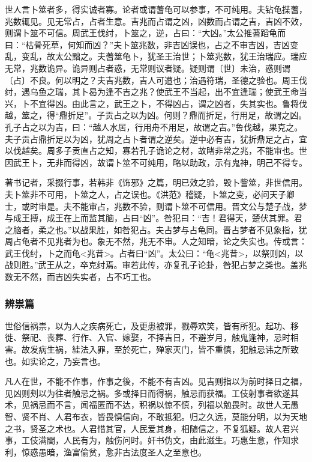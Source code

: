 \documentclass[]{article}
\begin{document}
世人言卜筮者多，得实诚者寡。论者或谓蓍龟可以参事，不可纯用。夫钻龟揲蓍，兆数辄见。见无常占，占者生意。吉兆而占谓之凶，凶数而占谓之吉，吉凶不效，则谓卜筮不可信。周武王伐纣，卜筮之，逆，占曰：``大凶。''太公推蓍蹈龟而曰：``枯骨死草，何知而凶？''夫卜筮兆数，非吉凶误也，占之不审吉凶，吉凶变乱，变乱，故太公黜之。夫蓍筮龟卜，犹圣王治世；卜筮兆数，犹王治瑞应。瑞应无常，兆数诡异。诡异则占者惑，无常则议者疑。疑则谓〔世〕未治，惑则谓〔占〕不良。何以明之？夫吉兆数，吉人可遭也；治遇符瑞，圣德之验也。周王伐纣，遇乌鱼之瑞，其卜曷为逢不吉之兆？使武王不当起，出不宜逢瑞；使武王命当兴，卜不宜得凶。由此言之，武王之卜，不得凶占，谓之凶者，失其实也。鲁将伐越，筮之，得``鼎折足''。子贡占之以为凶。何则？鼎而折足，行用足，故谓之凶。孔子占之以为吉，曰：``越人水居，行用舟不用足，故谓之吉。''鲁伐越，果克之。夫子贡占鼎折足以为凶，犹周之占卜者谓之逆矣。逆中必有吉，犹折鼎足之占，宜以伐越矣。周多子贡直占之知，寡若孔子诡论之材，故睹非常之兆，不能审也。世因武王卜，无非而得凶，故谓卜筮不可纯用，略以助政，示有鬼神，明己不得专。

著书记者，采掇行事，若韩非《饰邪》之篇，明已效之验，毁卜訾筮，非世信用。夫卜筮非不可用，卜筮之人，占之误也。《洪范》稽疑，卜筮之变，必问天子卿士，或时审是。夫不能审占，兆数不验，则谓卜筮不可信用。晋文公与楚子战，梦与成王搏，成王在上而监其脑，占曰``凶''。咎犯曰：``吉！君得天，楚伏其罪。君之脑者，柔之也。''以战果胜，如咎犯占。夫占梦与占龟同。晋占梦者不见象指，犹周占龟者不见兆者为也。象无不然，兆无不审。人之知暗，论之失实也。传或言：武王伐纣，卜之而龟\textless{}兆昔\textgreater{}。占者曰``凶''。太公曰：``龟\textless{}兆昔\textgreater{}，以祭则凶，以战则胜。''武王从之，卒克纣焉。审若此传，亦复孔子论卦，咎犯占梦之类也。盖兆数无不然，而吉凶失实者，占不巧工也。

\hypertarget{header-n846}{%
\subsubsection{辨祟篇}\label{header-n846}}

世俗信祸祟，以为人之疾病死亡，及更患被罪，戮辱欢笑，皆有所犯。起功、移徙、祭祀、丧葬、行作、入官、嫁娶，不择吉日，不避岁月，触鬼逢神，忌时相害。故发病生祸，絓法入罪，至於死亡，殚家灭门，皆不重慎，犯触忌讳之所致也。如实论之，乃妄言也。

凡人在世，不能不作事，作事之後，不能不有吉凶。见吉则指以为前时择日之福，见凶则刾以为往者触忌之祸。多或择日而得祸，触忌而获福。工伎射事者欲遂其术，见祸忌而不言，闻福匿而不达，积祸以惊不慎，列福以勉畏时。故世人无愚智、贤不肖、人君布衣，皆畏惧信向，不敢抵犯。归之久远，莫能分明，以为天地之书，贤圣之术也。人君惜其官，人民爱其身，相随信之，不复狐疑。故人君兴事，工伎满閤，人民有为，触伤问时。奸书伪文，由此滋生。巧惠生意，作知求利，惊惑愚暗，渔富偷贫，愈非古法度圣人之至意也。
\end{document}
